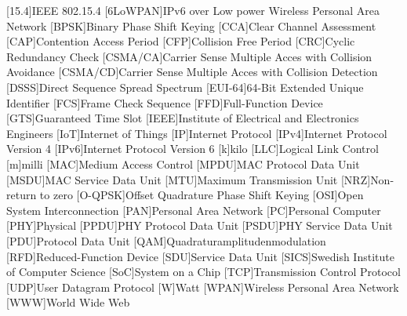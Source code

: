 \begin{acronym}[6LoWPAN]
	[15.4]{IEEE 802.15.4}
	[6LoWPAN]{IPv6 over Low power Wireless Personal Area Network}
	[BPSK]{Binary Phase Shift Keying}
	[CCA]{Clear Channel Assessment}
	[CAP]{Contention Access Period}
	[CFP]{Collision Free Period}
	[CRC]{Cyclic Redundancy Check}
	[CSMA/CA]{Carrier Sense Multiple Acces with Collision Avoidance}
	[CSMA/CD]{Carrier Sense Multiple Acces with Collision Detection}
	[DSSS]{Direct Sequence Spread Spectrum}
	[EUI-64]{64-Bit Extended Unique Identifier}
	[FCS]{Frame Check Sequence}
	[FFD]{Full-Function Device}
	[GTS]{Guaranteed Time Slot}
	[IEEE]{Institute of Electrical and Electronics Engineers}
	[IoT]{Internet of Things}
	[IP]{Internet Protocol}
	[IPv4]{Internet Protocol Version 4}
	[IPv6]{Internet Protocol Version 6}
	{kilo}
	[LLC]{Logical Link Control}
	{milli}
	[MAC]{Medium Access Control}
	[MPDU]{MAC Protocol Data Unit}
	[MSDU]{MAC Service Data Unit}
	[MTU]{Maximum Transmission Unit}
	[NRZ]{Non-return to zero}
	[O-QPSK]{Offset Quadrature Phase Shift Keying}
	[OSI]{Open System Interconnection}
	[PAN]{Personal Area Network}
	[PC]{Personal Computer}
	[PHY]{Physical}
	[PPDU]{PHY Protocol Data Unit}
	[PSDU]{PHY Service Data Unit}
	[PDU]{Protocol Data Unit}
	[QAM]{Quadraturamplitudenmodulation}
	[RFD]{Reduced-Function Device}
	[SDU]{Service Data Unit}
	[SICS]{Swedish Institute of Computer Science}
	[SoC]{System on a Chip}
	[TCP]{Transmission Control Protocol}
	[UDP]{User Datagram Protocol}
	{Watt}
	[WPAN]{Wireless Personal Area Network}
	[WWW]{World Wide Web}
\end{acronym}